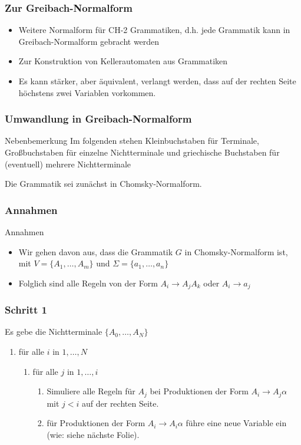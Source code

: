 \begin{frame}
\frametitle{Zur Greibach-Normalform}
\begin{itemize}
\item Weitere Normalform für CH-2 Grammatiken, d.h. jede Grammatik kann in Greibach-Normalform gebracht werden
\item Zur Konstruktion von Kellerautomaten aus Grammatiken
\item Es kann stärker, aber äquivalent, verlangt werden, dass auf der rechten Seite höchstens zwei Variablen vorkommen.
\end{itemize}
\end{frame}

\begin{frame}
\frametitle{Umwandlung in Greibach-Normalform}
\begin{exampleblock}{Nebenbemerkung}
Im folgenden stehen Kleinbuchstaben für Terminale, Großbuchstaben für einzelne Nichtterminale und griechische Buchstaben für (eventuell) mehrere Nichtterminale 
\end{exampleblock}
Die Grammatik sei zunächst in Chomsky-Normalform.
\end{frame}

\begin{frame}
\frametitle{Annahmen}
\begin{block}{Annahmen}
\begin{itemize}
 \item Wir gehen davon aus, dass die Grammatik $G$ in Chomsky-Normalform ist, mit $V = \{A_1, \ldots, A_m \}$ und $\Sigma = \{a_1, \ldots, a_n\}$
 \item Folglich sind alle Regeln von der Form $A_i \rightarrow A_jA_k$ oder $A_i \rightarrow a_j$
\end{itemize}
\end{block}
\end{frame}

\begin{frame}
\frametitle{Schritt 1}
Es gebe die Nichtterminale $\{A_0, \ldots, A_N\}$
\begin{enumerate}
\item für alle $i$ in $1, \ldots, N$
\begin{enumerate}
\item für alle $j$ in $1, \ldots, i$
\begin{enumerate}
\item Simuliere alle Regeln für $A_j$ bei Produktionen der Form $A_i \rightarrow A_j\alpha$ mit $j < i$ auf der rechten Seite.
\item für Produktionen der Form $A_i \rightarrow A_i\alpha$ führe eine neue Variable ein (wie: siehe nächste Folie).
\end{enumerate}
\end{enumerate}
\end{enumerate}
\end{frame}

